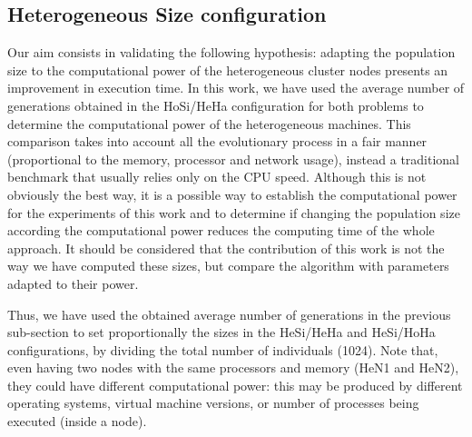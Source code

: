 \documentclass[final,1p,times]{elsarticle}
\begin{document}
\begin{table}
\end{table}


\subsection{Heterogeneous Size configuration}

Our aim consists in validating the following hypothesis: adapting the population size to the computational power of the heterogeneous cluster nodes presents an improvement in execution time. In this work, we have used the average number of generations obtained in the HoSi/HeHa configuration for both problems to determine the computational power of the heterogeneous machines. This comparison takes into account all the evolutionary process in a fair manner (proportional to the memory, processor and network usage), instead a traditional benchmark that usually relies only on the CPU speed. Although this is not obviously the best way, it is a possible way to establish the computational power for the experiments of this work and to determine if changing the population size according the computational power reduces the computing time of the whole approach. It should be considered that the contribution of this work is not the way we have computed these sizes, but compare the algorithm with parameters adapted to their power.

Thus, we have used the obtained average number of generations in the previous sub-section to set proportionally the sizes in the HeSi/HeHa and HeSi/HoHa configurations, by dividing the total number of individuals (1024). Note that, even having two nodes with the same processors and memory (HeN1 and HeN2), they could have different computational power: this may be produced by different operating systems, virtual machine versions, or number of processes being executed (inside a node).
\end{document}
